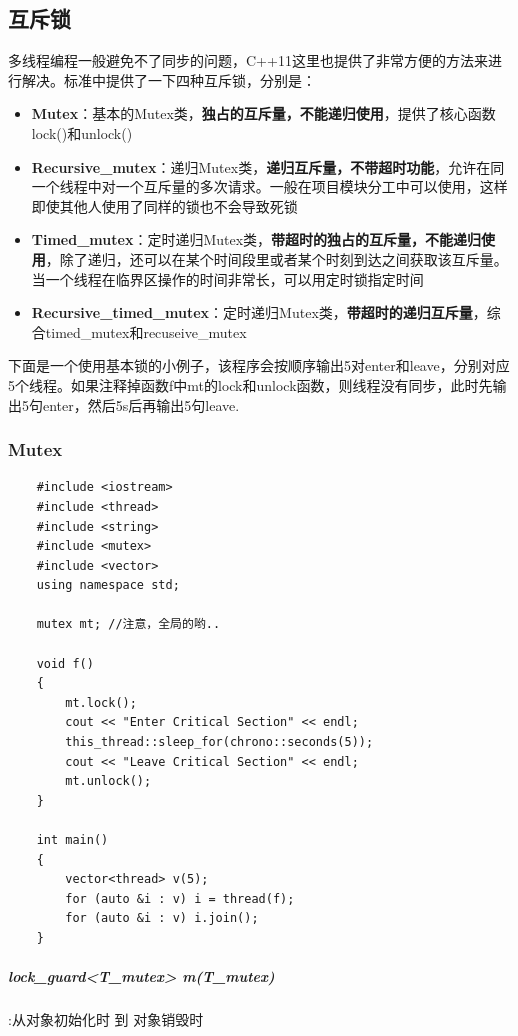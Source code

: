 \documentclass[UTF8,a4paper,12pt]{ctexbook}
\begin{document}
	\subsection{互斥锁}
		多线程编程一般避免不了同步的问题，C++11这里也提供了非常方便的方法来进行解决。标准中提供了一下四种互斥锁，分别是：
		\begin{itemize}
			\item  \textbf{Mutex}：基本的Mutex类，\textbf{独占的互斥量，不能递归使用}，提供了核心函数lock()和unlock()
			\item  \textbf{Recursive\_mutex}：递归Mutex类，\textbf{递归互斥量，不带超时功能}，允许在同一个线程中对一个互斥量的多次请求。一般在项目模块分工中可以使用，这样即使其他人使用了同样的锁也不会导致死锁
			\item \textbf{Timed\_mutex}：定时递归Mutex类，\textbf{带超时的独占的互斥量，不能递归使用}，除了递归，还可以在某个时间段里或者某个时刻到达之间获取该互斥量。当一个线程在临界区操作的时间非常长，可以用定时锁指定时间
			\item \textbf{Recursive\_timed\_mutex}：定时递归Mutex类，\textbf{带超时的递归互斥量}，综合timed\_mutex和recuseive\_mutex
		\end{itemize}
		
		下面是一个使用基本锁的小例子，该程序会按顺序输出5对enter和leave，分别对应5个线程。如果注释掉函数f中mt的lock和unlock函数，则线程没有同步，此时先输出5句enter，然后5s后再输出5句leave.
		\subsubsection{Mutex}
			\begin{lstlisting}
	#include <iostream>
	#include <thread>
	#include <string>
	#include <mutex>
	#include <vector>
	using namespace std;
	
	mutex mt; //注意，全局的哟..
	
	void f()
	{
		mt.lock();
		cout << "Enter Critical Section" << endl;
		this_thread::sleep_for(chrono::seconds(5));
		cout << "Leave Critical Section" << endl;
		mt.unlock();
	}
	
	int main()
	{
		vector<thread> v(5);
		for (auto &i : v) i = thread(f);
		for (auto &i : v) i.join();
	}
		\end{lstlisting}
		\subparagraph{lock\_guard<T\_mutex> m(T\_mutex)}:从对象初始化时 到 对象销毁时
		
\end{document}
